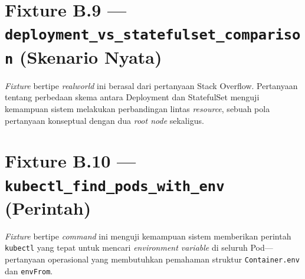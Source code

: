 \section{Fixture B.9 — \texttt{deployment\_vs\_statefulset\_comparison} (Skenario Nyata)}

\textit{Fixture} bertipe \textit{realworld} ini berasal dari pertanyaan Stack Overflow. Pertanyaan tentang perbedaan skema antara Deployment dan StatefulSet menguji kemampuan sistem melakukan perbandingan lintas \textit{resource}, sebuah pola pertanyaan konseptual dengan dua \textit{root node} sekaligus.



\section{Fixture B.10 — \texttt{kubectl\_find\_pods\_with\_env} (Perintah)}

\textit{Fixture} bertipe \textit{command} ini menguji kemampuan sistem memberikan perintah \allowbreak\texttt{kubectl} yang tepat untuk mencari \textit{environment variable} di seluruh Pod—pertanyaan operasional yang membutuhkan pemahaman struktur \texttt{Container.env} dan \texttt{envFrom}.


